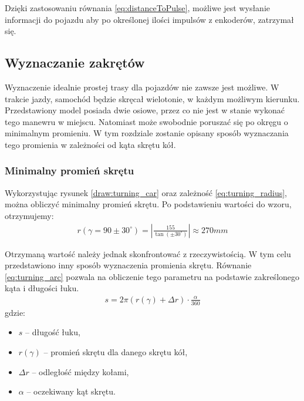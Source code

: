         Dzięki zastosowaniu równania \eqref{eq:distanceToPulse}, możliwe jest wysłanie informacji do pojazdu aby po określonej ilości impulsów z enkoderów, zatrzymał się.


    \subsection{Wyznaczanie zakrętów}
        Wyznaczenie idealnie prostej trasy dla pojazdów nie zawsze jest możliwe.
        W trakcie jazdy, samochód będzie skręcał wielotonie, w każdym możliwym kierunku.
        Przedstawiony model posiada dwie osiowe, przez co nie jest w stanie wykonać tego manewru w miejscu.
        Natomiast może swobodnie poruszać się po okręgu o minimalnym promieniu.
        W tym rozdziale zostanie opisany sposób wyznaczania tego promienia w zależności od kąta skrętu kół.

        \subsubsection{Minimalny promień skrętu}
        \label{subsubsec:minamalny_promien}
            Wykorzystując rysunek \ref{draw:turning_car} oraz zależność \eqref{eq:turning_radius}, można obliczyć minimalny promień skrętu.
            Po podstawieniu wartości do wzoru, otrzymujemy:
            \begin{gather}
                r(\gamma = 90 \pm 30^\circ) = \left|\frac{155}{\tan(\pm 30^\circ)}\right| \approx 270mm
                \label{eq:theoretical_radius}
            \end{gather}

            Otrzymaną wartość należy jednak skonfrontować z rzeczywistością.
            W tym celu przedstawiono inny sposób wyznaczenia promienia skrętu.
            Równanie \eqref{eq:turning_arc} pozwala na obliczenie tego parametru na podstawie zakreślonego kąta i długości łuku.
            \begin{gather}
                s = 2\pi (r(\gamma) + \Delta r) \cdot \frac{\alpha}{360}
                \label{eq:turning_arc}
            \end{gather}
            gdzie:
            \begin{itemize}
                \item $s$ -- długość łuku,
                \item $r(\gamma)$ -- promień skrętu dla danego skrętu kół,
                \item $\Delta r$ -- odległość między kołami,
                \item $\alpha$ -- oczekiwany kąt skrętu.
            \end{itemize}

